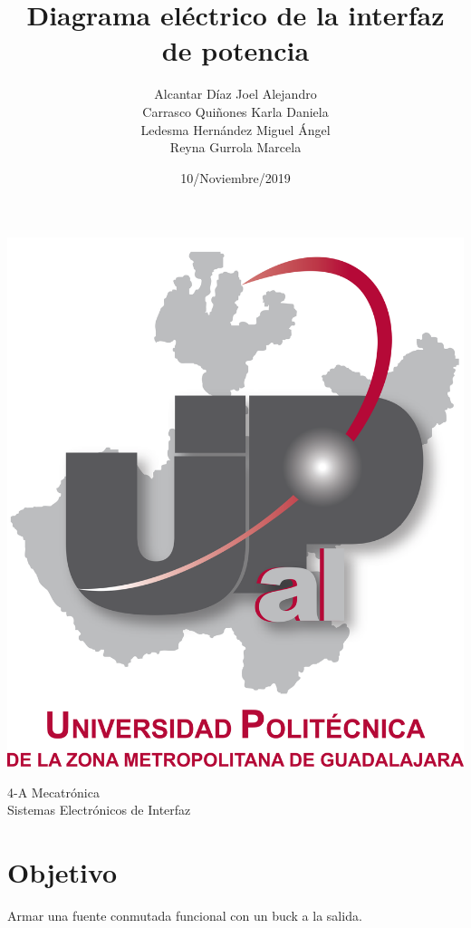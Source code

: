 \documentclass[letterpaper]{article}
\title{Diagrama eléctrico de la interfaz de potencia}
\author{Alcantar Díaz Joel Alejandro\\ Carrasco Quiñones Karla Daniela\\ Ledesma Hernández Miguel Ángel\\  Reyna Gurrola Marcela\\ }
\date{10/Noviembre/2019}
\begin{document}
\maketitle
\vspace{2cm}
\begin{large}
    \begin{center}
        \includegraphics[scale=0.5]{IMG/UPZMGlog.png}
    \end{center}
\end{large}
\vspace{2cm}
\begin{center}
4-A Mecatrónica\\
Sistemas Electrónicos de Interfaz   
\end{center}

\newpage

\section{Objetivo}
\begin{large}
    Armar una fuente conmutada funcional con un buck a la salida.
\end{large}
\end{document}
